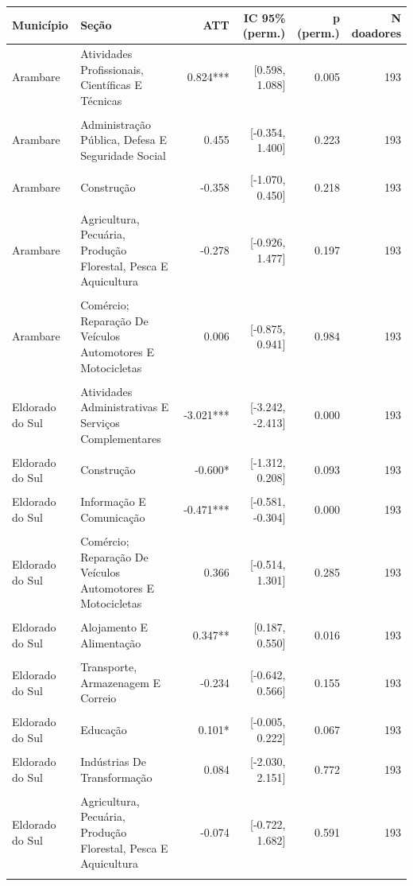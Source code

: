 \begin{tabular}{llrrrr}
\hline
Munic\'{i}pio & Se\c{c}\~{a}o & ATT & IC 95\% (perm.) & p (perm.) & N doadores \\
\hline
Arambare & Atividades Profissionais, Científicas E Técnicas & 0.824*** & [0.598, 1.088] & 0.005 & 193 \\\\
Arambare & Administração Pública, Defesa E Seguridade Social & 0.455 & [-0.354, 1.400] & 0.223 & 193 \\\\
Arambare & Construção & -0.358 & [-1.070, 0.450] & 0.218 & 193 \\\\
Arambare & Agricultura, Pecuária, Produção Florestal, Pesca E Aquicultura & -0.278 & [-0.926, 1.477] & 0.197 & 193 \\\\
Arambare & Comércio; Reparação De Veículos Automotores E Motocicletas & 0.006 & [-0.875, 0.941] & 0.984 & 193 \\\\
Eldorado do Sul & Atividades Administrativas E Serviços Complementares & -3.021*** & [-3.242, -2.413] & 0.000 & 193 \\\\
Eldorado do Sul & Construção & -0.600* & [-1.312, 0.208] & 0.093 & 193 \\\\
Eldorado do Sul & Informação E Comunicação & -0.471*** & [-0.581, -0.304] & 0.000 & 193 \\\\
Eldorado do Sul & Comércio; Reparação De Veículos Automotores E Motocicletas & 0.366 & [-0.514, 1.301] & 0.285 & 193 \\\\
Eldorado do Sul & Alojamento E Alimentação & 0.347** & [0.187, 0.550] & 0.016 & 193 \\\\
Eldorado do Sul & Transporte, Armazenagem E Correio & -0.234 & [-0.642, 0.566] & 0.155 & 193 \\\\
Eldorado do Sul & Educação & 0.101* & [-0.005, 0.222] & 0.067 & 193 \\\\
Eldorado do Sul & Indústrias De Transformação & 0.084 & [-2.030, 2.151] & 0.772 & 193 \\\\
Eldorado do Sul & Agricultura, Pecuária, Produção Florestal, Pesca E Aquicultura & -0.074 & [-0.722, 1.682] & 0.591 & 193 \\\\

\end{tabular}
